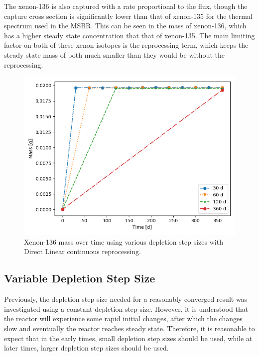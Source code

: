 The xenon-136 is also captured with a rate proportional to the flux, though the capture cross section is significantly lower than that of xenon-135 for the thermal spectrum used in the MSBR. This can be seen in the mass of xenon-136, which has a higher steady state concentration that that of xenon-135. The main limiting factor on both of these xenon isotopes is the reprocessing term, which keeps the steady state mass of both much smaller than they would be without the reprocessing.

\begin{figure}[H]
  \centering
  \includegraphics[scale=0.7]{images/DL_NSTEP_Xe-136_mass-large.png}
  \caption{Xenon-136 mass over time using various depletion step sizes with Direct Linear continuous reprocessing.}
   \label{fig:DL-cont-xe136-2}
\end{figure}


\subsection{Variable Depletion Step Size}

Previously, the depletion step size needed for a reasonably converged result was investigated using a constant depletion step size. However, it is understood that the reactor will experience some rapid initial changes, after which the changes slow and eventually the reactor reaches steady state. Therefore, it is reasonable to expect that in the early times, small depletion step sizes should be used, while at later times, larger depletion step sizes should be used.

